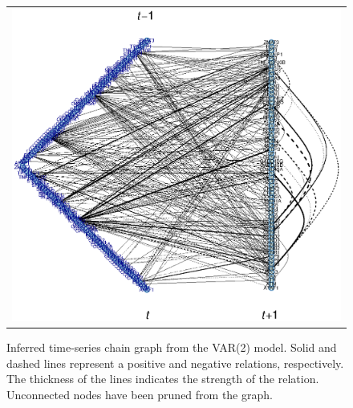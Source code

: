 \begin{figure}[h!]
\centering
\begin{tabular}{c}
\includegraphics[scale=0.6]{Figure_6.eps}
\end{tabular}
\caption{Inferred time-series chain graph from the VAR(2) model. Solid and dashed lines represent a positive and negative relations, respectively. The thickness of the lines indicates the strength of the relation. Unconnected nodes have been pruned from the graph.}
\label{fig:graphVAR2}
\end{figure}


